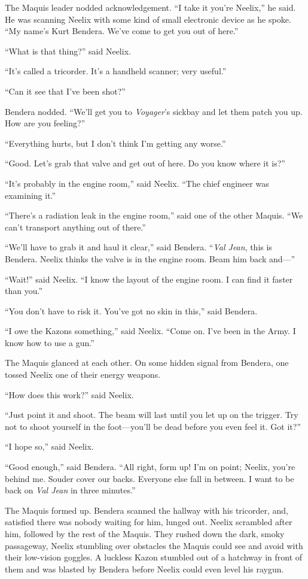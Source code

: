 \documentclass[twoside,letterpaper,12pt]{memoir}
\begin{document}
The Maquis leader nodded acknowledgement. ``I take it you’re Neelix,'' he said. He was scanning Neelix with some kind of small electronic device as he spoke. ``My name’s Kurt Bendera. We’ve come to get you out of here.''

``What is that thing?'' said Neelix.

``It’s called a tricorder. It’s a handheld scanner; very useful.''

``Can it see that I’ve been shot?''

Bendera nodded. ``We’ll get you to \textit{Voyager}’s sickbay and let them patch you up. How are you feeling?''

``Everything hurts, but I don’t think I’m getting any worse.''

``Good. Let's grab that valve and get out of here. Do you know where it is?''

``It's probably in the engine room,'' said Neelix. ``The chief engineer was examining it.''

``There's a radiation leak in the engine room,'' said one of the other Maquis. ``We can't transport anything out of there.''

``We'll have to grab it and haul it clear,'' said Bendera. ``\textit{Val Jean}, this is Bendera. Neelix thinks the valve is in the engine room. Beam him back and---''

``Wait!'' said Neelix. ``I know the layout of the engine room. I can find it faster than you.''

``You don't have to risk it. You've got no skin in this,'' said Bendera.

``I owe the Kazons something,'' said Neelix. ``Come on. I've been in the Army. I know how to use a gun.''

The Maquis glanced at each other. On some hidden signal from Bendera, one tossed Neelix one of their energy weapons.

``How does this work?'' said Neelix.

``Just point it and shoot. The beam will last until you let up on the trigger. Try not to shoot yourself in the foot---you'll be dead before you even feel it. Got it?''

``I hope so,'' said Neelix.

``Good enough,'' said Bendera. ``All right, form up! I'm on point; Neelix, you're behind me. Souder cover our backs. Everyone else fall in between. I want to be back on \textit{Val Jean} in three minutes.''

The Maquis formed up. Bendera scanned the hallway with his tricorder, and, satisfied there was nobody waiting for him, lunged out. Neelix scrambled after him, followed by the rest of the Maquis. They rushed down the dark, smoky passageway, Neelix stumbling over obstacles the Maquis could see and avoid with their low-vision goggles. A luckless Kazon stumbled out of a hatchway in front of them and was blasted by Bendera before Neelix could even level his raygun.
\end{document}

